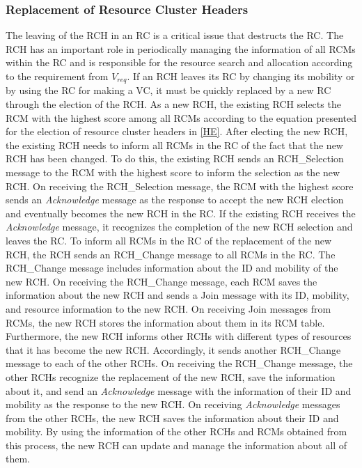 \documentclass[sensors,article,accept,moreauthors,pdftex]{Definitions/mdpi}
\begin{document}
\subsubsection{Replacement of Resource Cluster Headers}
The leaving of the RCH in an RC is a critical issue that destructs the RC. 
The RCH has an important role in periodically managing the information of all RCMs within the RC and is responsible for the resource search and allocation according to the requirement from $V_{req}$. 
If an RCH leaves its RC by changing its mobility or by using the RC for making a VC, it must be quickly replaced by a new RC through the election of the RCH.
As a new RCH, the existing RCH selects the RCM with the highest score among all RCMs according to the equation presented for the election of resource cluster headers in \ref{HE}. %
After electing the new RCH, the existing RCH needs to inform all RCMs in the RC of the fact that the new RCH has been changed. 
To do this, the existing RCH sends an RCH\_Selection message to the RCM with the highest score to inform the selection as the new RCH.
On receiving the RCH\_Selection message, the RCM with the highest score sends an \textit{Acknowledge} message as the response to accept the new RCH election and eventually becomes the new RCH in the RC. 
If the existing RCH receives the \textit{Acknowledge} message, it recognizes the completion of the new RCH selection and leaves the RC.
To inform all RCMs in the RC of the replacement of the new RCH, the RCH sends an RCH\_Change message to all RCMs in the RC.
The RCH\_Change message includes information about the ID and mobility of the new RCH.
On receiving the RCH\_Change message, each RCM saves the information about the new RCH and sends a Join message with its ID, mobility, and resource information to the new RCH.
On receiving Join messages from RCMs, the new RCH stores the information about them in its RCM table.
Furthermore, the new RCH informs other RCHs with different types of resources that it has become the new RCH.
Accordingly, it sends another RCH\_Change message to each of the other RCHs.
On receiving the RCH\_Change message, the other RCHs recognize the replacement of the new RCH, save the information about it, and send an \textit{Acknowledge} message with the information of their ID and mobility as the response to the new RCH.
On receiving \textit{Acknowledge} messages from the other RCHs, the new RCH saves the information about their ID and mobility.
By using the information of the other RCHs and RCMs obtained from this process, the new RCH can update and manage the information about all of them.
\end{document}

